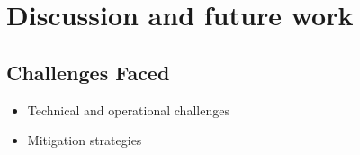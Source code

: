 \chapter{Discussion and future work}

\section{Challenges Faced}
\begin{itemize}
    \item Technical and operational challenges
    \item Mitigation strategies
\end{itemize}


